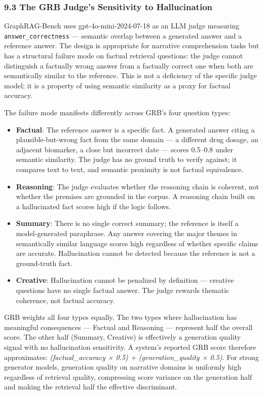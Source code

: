 \subsubsection{9.3 The GRB Judge's Sensitivity to Hallucination}\label{the-grb-judges-sensitivity-to-hallucination}

GraphRAG-Bench uses gpt-4o-mini-2024-07-18 as an LLM judge measuring \texttt{answer\_correctness} --- semantic overlap between a generated answer and a reference answer. The design is appropriate for narrative comprehension tasks but has a structural failure mode on factual retrieval questions: the judge cannot distinguish a factually wrong answer from a factually correct one when both are semantically similar to the reference. This is not a deficiency of the specific judge model; it is a property of using semantic similarity as a proxy for factual accuracy.

The failure mode manifests differently across GRB's four question types:

\begin{itemize}
\item
  \textbf{Factual}: The reference answer is a specific fact. A generated answer citing a plausible-but-wrong fact from the same domain --- a different drug dosage, an adjacent biomarker, a close but incorrect date --- scores 0.5--0.8 under semantic similarity. The judge has no ground truth to verify against; it compares text to text, and semantic proximity is not factual equivalence.
\item
  \textbf{Reasoning}: The judge evaluates whether the reasoning chain is coherent, not whether the premises are grounded in the corpus. A reasoning chain built on a hallucinated fact scores high if the logic follows.
\item
  \textbf{Summary}: There is no single correct summary; the reference is itself a model-generated paraphrase. Any answer covering the major themes in semantically similar language scores high regardless of whether specific claims are accurate. Hallucination cannot be detected because the reference is not a ground-truth fact.
\item
  \textbf{Creative}: Hallucination cannot be penalized by definition --- creative questions have no single factual answer. The judge rewards thematic coherence, not factual accuracy.
\end{itemize}

GRB weights all four types equally. The two types where hallucination has meaningful consequences --- Factual and Reasoning --- represent half the overall score. The other half (Summary, Creative) is effectively a generation quality signal with no hallucination sensitivity. A system's reported GRB score therefore approximates: \emph{(factual\_accuracy × 0.5) + (generation\_quality × 0.5)}. For strong generator models, generation quality on narrative domains is uniformly high regardless of retrieval quality, compressing score variance on the generation half and making the retrieval half the effective discriminant.

